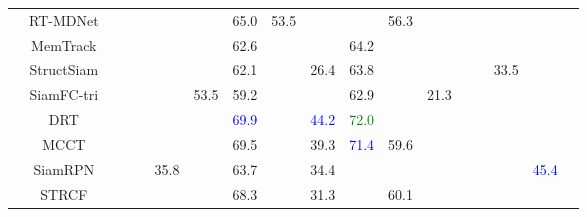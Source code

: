 \documentclass[10pt,twocolumn,letterpaper]{article}
\begin{document}
\begin{table*}[t]
\begin{tabular}{cccccccccccccccccc}
 & RT-MDNet \cite{Jung18ECCV} &  &  &  &  &  & 65.0 & 53.5 &  &  & 56.3 &  &  &  &  &  & \tabularnewline
\cmidrule{2-18} \cmidrule{3-18} \cmidrule{4-18} \cmidrule{5-18} \cmidrule{6-18} \cmidrule{7-18} \cmidrule{8-18} \cmidrule{9-18} \cmidrule{10-18} \cmidrule{11-18} \cmidrule{12-18} \cmidrule{13-18} \cmidrule{14-18} \cmidrule{15-18} \cmidrule{16-18} \cmidrule{17-18} \cmidrule{18-18} 
 & MemTrack \cite{Yang18ECCV} &  &  &  &  &  & 62.6 &  &  & 64.2 &  &  &  &  &  &  & \tabularnewline
\cmidrule{2-18} \cmidrule{3-18} \cmidrule{4-18} \cmidrule{5-18} \cmidrule{6-18} \cmidrule{7-18} \cmidrule{8-18} \cmidrule{9-18} \cmidrule{10-18} \cmidrule{11-18} \cmidrule{12-18} \cmidrule{13-18} \cmidrule{14-18} \cmidrule{15-18} \cmidrule{16-18} \cmidrule{17-18} \cmidrule{18-18} 
 & StructSiam \cite{Zhang18ECCV_Structured} &  &  &  &  &  & 62.1 &  & 26.4 & 63.8 &  &  &  &  & 33.5 &  & \tabularnewline
\cmidrule{2-18} \cmidrule{3-18} \cmidrule{4-18} \cmidrule{5-18} \cmidrule{6-18} \cmidrule{7-18} \cmidrule{8-18} \cmidrule{9-18} \cmidrule{10-18} \cmidrule{11-18} \cmidrule{12-18} \cmidrule{13-18} \cmidrule{14-18} \cmidrule{15-18} \cmidrule{16-18} \cmidrule{17-18} \cmidrule{18-18} 
 & SiamFC-tri \cite{Dong18ECCV} &  &  &  &  & 53.5 & 59.2 &  &  & 62.9 &  & 21.3 &  &  &  &  & \tabularnewline
\midrule
 & DRT \cite{Sun18CVPR_Reliability} &  &  &  &  &  & \textcolor{blue}{69.9} &  & \textcolor{blue}{44.2} & \textcolor{green}{72.0} &  &  &  &  &  &  & \tabularnewline
\cmidrule{2-18} \cmidrule{3-18} \cmidrule{4-18} \cmidrule{5-18} \cmidrule{6-18} \cmidrule{7-18} \cmidrule{8-18} \cmidrule{9-18} \cmidrule{10-18} \cmidrule{11-18} \cmidrule{12-18} \cmidrule{13-18} \cmidrule{14-18} \cmidrule{15-18} \cmidrule{16-18} \cmidrule{17-18} \cmidrule{18-18} 
 & MCCT \cite{Wang18CVPR} &  &  &  &  &  & 69.5 &  & 39.3 & \textcolor{blue}{71.4} & 59.6 &  &  &  &  &  & \tabularnewline
\cmidrule{2-18} \cmidrule{3-18} \cmidrule{4-18} \cmidrule{5-18} \cmidrule{6-18} \cmidrule{7-18} \cmidrule{8-18} \cmidrule{9-18} \cmidrule{10-18} \cmidrule{11-18} \cmidrule{12-18} \cmidrule{13-18} \cmidrule{14-18} \cmidrule{15-18} \cmidrule{16-18} \cmidrule{17-18} \cmidrule{18-18} 
 & SiamRPN \cite{Li18CVPRSiamRPN} &  &  &  & 35.8 &  & 63.7 &  & 34.4 &  &  &  &  &  &  & \textcolor{blue}{45.4} & \tabularnewline
\cmidrule{2-18} \cmidrule{3-18} \cmidrule{4-18} \cmidrule{5-18} \cmidrule{6-18} \cmidrule{7-18} \cmidrule{8-18} \cmidrule{9-18} \cmidrule{10-18} \cmidrule{11-18} \cmidrule{12-18} \cmidrule{13-18} \cmidrule{14-18} \cmidrule{15-18} \cmidrule{16-18} \cmidrule{17-18} \cmidrule{18-18} 
 & STRCF \cite{Li18CVPR_Regularized} &  &  &  &  &  & 68.3 &  & 31.3 &  & 60.1 &  &  &  &  &  & \tabularnewline

\end{tabular}
\end{table*}
\end{document}
